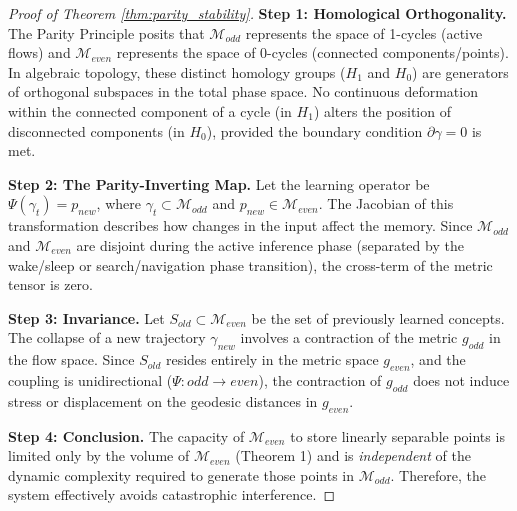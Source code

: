 \documentclass{article}
\begin{document}
 
\begin{proof}[Proof of Theorem \ref{thm:parity_stability}]
\textbf{Step 1: Homological Orthogonality.}
The Parity Principle posits that $\mathcal{M}_{odd}$ represents the space of 1-cycles (active flows) and $\mathcal{M}_{even}$ represents the space of 0-cycles (connected components/points). In algebraic topology, these distinct homology groups ($H_1$ and $H_0$) are generators of orthogonal subspaces in the total phase space. No continuous deformation within the connected component of a cycle (in $H_1$) alters the position of disconnected components (in $H_0$), provided the boundary condition $\partial \gamma = 0$ is met.
 
\textbf{Step 2: The Parity-Inverting Map.}
Let the learning operator be $\Psi(\gamma_t) = p_{new}$, where $\gamma_t \subset \mathcal{M}_{odd}$ and $p_{new} \in \mathcal{M}_{even}$.
The Jacobian of this transformation describes how changes in the input affect the memory.
Since $\mathcal{M}_{odd}$ and $\mathcal{M}_{even}$ are disjoint during the active inference phase (separated by the wake/sleep or search/navigation phase transition), the cross-term of the metric tensor is zero.
 
\textbf{Step 3: Invariance.}
Let $S_{old} \subset \mathcal{M}_{even}$ be the set of previously learned concepts.
The collapse of a new trajectory $\gamma_{new}$ involves a contraction of the metric $g_{odd}$ in the flow space.
Since $S_{old}$ resides entirely in the metric space $g_{even}$, and the coupling is unidirectional ($\Psi: odd \to even$), the contraction of $g_{odd}$ does not induce stress or displacement on the geodesic distances in $g_{even}$.
 
\textbf{Step 4: Conclusion.}
The capacity of $\mathcal{M}_{even}$ to store linearly separable points is limited only by the volume of $\mathcal{M}_{even}$ (Theorem 1) and is \textit{independent} of the dynamic complexity required to generate those points in $\mathcal{M}_{odd}$. Therefore, the system effectively avoids catastrophic interference.
\end{proof}
\end{document}
